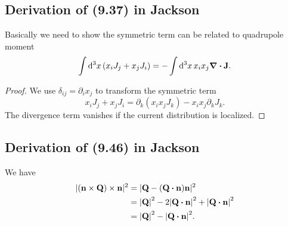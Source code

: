 \documentclass[10pt]{article}
\begin{document}
\subsection{Derivation of (9.37) in Jackson}

Basically we need to show the symmetric term can be related to quadrupole moment
\begin{equation}
	\int \dd[3]{x}(x_i J_j + x_j J_i) = -\int \dd[3]{x} x_i x_j \div{\vb{J}}.
\end{equation}
\begin{proof}
	We use $\delta_{ij} = \partial_i x_j$ to transform the symmetric term
	\begin{equation}
		x_i J_j + x_j J_i = \partial_k (x_i x_j J_k) - x_i x_j \partial_k J_k.
	\end{equation}
	The divergence term vanishes if the current distribution is localized.
\end{proof}

\subsection{Derivation of (9.46) in Jackson}
We have
\begin{align*}
	|(\vb{n} \times \vb{Q}) \times \vb{n}|^2 &= |\vb{Q}- (\vb{Q} \vdot \vb{n}) \vb{n}|^2\\
	&= \abs{\vb{Q}}^2 - 2\abs{\vb{Q} \vdot \vb{n}}^2 + \abs{\vb{Q} \vdot \vb{n}}^2 \\
	&= \abs{\vb{Q}}^2 - \abs{\vb{Q} \vdot \vb{n}}^2.
\end{align*}
\end{document}
